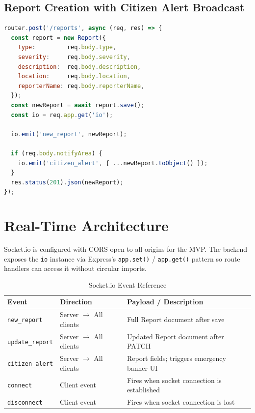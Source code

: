 \documentclass[12pt, a4paper]{report}
\begin{document}
\subsection{Report Creation with Citizen Alert Broadcast}

\begin{lstlisting}[language=JavaScript,
  caption={POST /api/reports --- with optional citizen alert broadcast}]
router.post('/reports', async (req, res) => {
  const report = new Report({
    type:         req.body.type,
    severity:     req.body.severity,
    description:  req.body.description,
    location:     req.body.location,
    reporterName: req.body.reporterName,
  });
  const newReport = await report.save();
  const io = req.app.get('io');

  io.emit('new_report', newReport);

  if (req.body.notifyArea) {
    io.emit('citizen_alert', { ...newReport.toObject() });
  }
  res.status(201).json(newReport);
});
\end{lstlisting}

\section{Real-Time Architecture}

Socket.io is configured with CORS open to all origins for the MVP. The backend exposes the \texttt{io} instance via Express's \texttt{app.set()} / \texttt{app.get()} pattern so route handlers can access it without circular imports.

\begin{table}[H]
  \centering
  \caption{Socket.io Event Reference}
  \begin{tabularx}{\textwidth}{l l X}
    \toprule
    \rowcolor{headerrow!20}
    \textbf{Event} & \textbf{Direction} & \textbf{Payload / Description} \\
    \midrule
    \texttt{new\_report}    & Server $\rightarrow$ All clients & Full Report document after save \\
    \rowcolor{rowshade}
    \texttt{update\_report} & Server $\rightarrow$ All clients & Updated Report document after PATCH \\
    \texttt{citizen\_alert} & Server $\rightarrow$ All clients & Report fields; triggers emergency banner UI \\
    \rowcolor{rowshade}
    \texttt{connect}        & Client event & Fires when socket connection is established \\
    \texttt{disconnect}     & Client event & Fires when socket connection is lost \\
    \bottomrule
  \end{tabularx}
\end{table}
\end{document}
